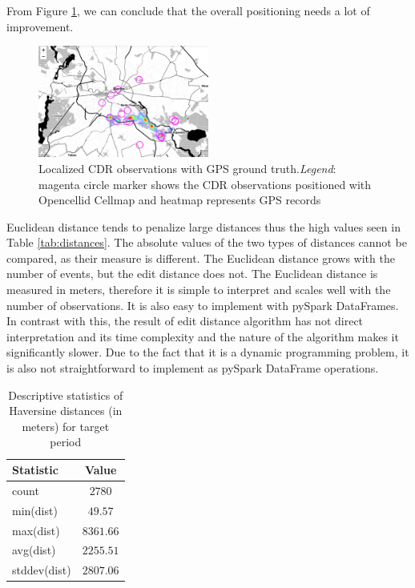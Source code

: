 From Figure \ref{fig:traj}, we can conclude that the overall positioning needs a lot of improvement. 

\begin{figure}[h]
    \centering
    \includegraphics[width=0.5\textwidth]{images/traj.png}
    \caption{Localized CDR observations with GPS ground truth.\textit{Legend}: magenta circle marker shows the CDR observations positioned with Opencellid Cellmap and heatmap represents GPS records}
    \label{fig:traj}
\end{figure}

Euclidean distance tends to penalize large distances thus the high values seen in Table \ref{tab:distances}. The absolute values of the two types of distances cannot be compared, as their measure is different. The Euclidean distance grows with the number of events, but the edit distance does not. 
The Euclidean distance is measured in meters, therefore it is simple to interpret and scales well with the number of observations. It is also easy to implement with pySpark DataFrames. In contrast with this, the result of edit distance algorithm has not direct interpretation and its time complexity and the nature of the algorithm makes it significantly slower. Due to the fact that it is a dynamic programming problem, it is also not straightforward to implement as pySpark DataFrame operations.

\begin{table}[h]
    \centering
    \begin{tabular}{|l|c|}
        \hline
        \textbf{Statistic} & \textbf{Value} \\
        \hline 
        count & $2780$ \\
        \hline
        min(dist) &  $49.57$\\
        \hline
        max(dist) &   $8361.66$\\
        \hline
        avg(dist) &  $2255.51$\\
        \hline
        stddev(dist) &  $2807.06$\\
        \hline
    \end{tabular}
    \caption{Descriptive statistics of Haversine distances (in meters) for target period}
    \label{tab:dist_stats}
\end{table}


